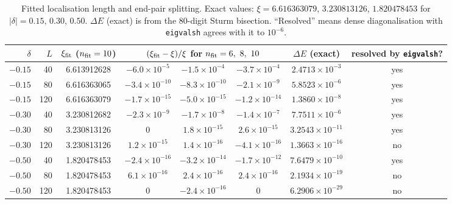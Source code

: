 \documentclass[11pt,a4paper]{article}
\begin{document}
\begin{table}[t]
  \centering
  \footnotesize
  \setlength{\tabcolsep}{4.5pt}
  \begin{tabular}{rrcccccc}
    \toprule
    $\delta$ & $L$ & $\xi_{\rm fit}$ ($n_{\rm fit}=10$) &
    \multicolumn{3}{c}{$(\xi_{\rm fit}-\xi)/\xi$ for $n_{\rm fit} = 6,\ 8,\ 10$} &
    $\Delta E$ (exact) & resolved by \texttt{eigvalsh}? \\
    \midrule
    $-0.15$ & 40  & 6.613912628 & $-6.0\times10^{-5}$  & $-1.5\times10^{-4}$  & $-3.7\times10^{-4}$  & $2.4713\times10^{-3}$  & yes \\
    $-0.15$ & 80  & 6.616363065 & $-3.4\times10^{-10}$ & $-8.3\times10^{-10}$ & $-2.1\times10^{-9}$  & $5.8523\times10^{-6}$  & yes \\
    $-0.15$ & 120 & 6.616363079 & $-1.7\times10^{-15}$ & $-5.0\times10^{-15}$ & $-1.2\times10^{-14}$ & $1.3860\times10^{-8}$  & yes \\
    \midrule
    $-0.30$ & 40  & 3.230812682 & $-2.3\times10^{-9}$  & $-1.7\times10^{-8}$  & $-1.4\times10^{-7}$  & $7.7511\times10^{-6}$  & yes \\
    $-0.30$ & 80  & 3.230813126 & $0$                  & $1.8\times10^{-15}$  & $2.6\times10^{-15}$  & $3.2543\times10^{-11}$ & yes \\
    $-0.30$ & 120 & 3.230813126 & $1.2\times10^{-15}$  & $1.4\times10^{-16}$  & $-4.1\times10^{-16}$ & $1.3663\times10^{-16}$ & no \\
    \midrule
    $-0.50$ & 40  & 1.820478453 & $-2.4\times10^{-16}$ & $-3.2\times10^{-14}$ & $-1.7\times10^{-12}$ & $7.6479\times10^{-10}$ & yes \\
    $-0.50$ & 80  & 1.820478453 & $6.1\times10^{-16}$  & $2.4\times10^{-16}$  & $2.4\times10^{-16}$  & $2.1934\times10^{-19}$ & no \\
    $-0.50$ & 120 & 1.820478453 & $0$                  & $-2.4\times10^{-16}$ & $0$                  & $6.2906\times10^{-29}$ & no \\
    \bottomrule
  \end{tabular}
  \caption{Fitted localisation length and end-pair splitting.
  Exact values: $\xi = 6.616363079$, $3.230813126$, $1.820478453$ for $|\delta| = 0.15,\,0.30,\,0.50$.
  $\Delta E$ (exact) is from the 80-digit Sturm bisection.
  ``Resolved'' means dense diagonalisation with \texttt{eigvalsh} agrees with it to $10^{-6}$.}
  \label{tab:xi}
\end{table}
\end{document}

